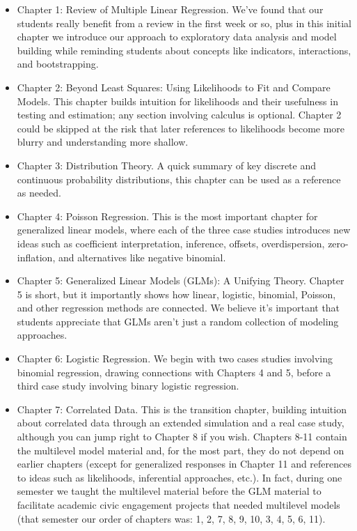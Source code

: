 \documentclass[
]{krantz}
\providecommand{\tightlist}{%
  \setlength{\itemsep}{0pt}\setlength{\parskip}{0pt}}
\begin{document}
\begin{itemize}
\tightlist
\item
  Chapter 1: Review of Multiple Linear Regression. We've found that our students really benefit from a review in the first week or so, plus in this initial chapter we introduce our approach to exploratory data analysis and model building while reminding students about concepts like indicators, interactions, and bootstrapping.
\item
  Chapter 2: Beyond Least Squares: Using Likelihoods to Fit and Compare Models. This chapter builds intuition for likelihoods and their usefulness in testing and estimation; any section involving calculus is optional. Chapter 2 could be skipped at the risk that later references to likelihoods become more blurry and understanding more shallow.
\item
  Chapter 3: Distribution Theory. A quick summary of key discrete and continuous probability distributions, this chapter can be used as a reference as needed.
\item
  Chapter 4: Poisson Regression. This is the most important chapter for generalized linear models, where each of the three case studies introduces new ideas such as coefficient interpretation, inference, offsets, overdispersion, zero-inflation, and alternatives like negative binomial.
\item
  Chapter 5: Generalized Linear Models (GLMs): A Unifying Theory. Chapter 5 is short, but it importantly shows how linear, logistic, binomial, Poisson, and other regression methods are connected. We believe it's important that students appreciate that GLMs aren't just a random collection of modeling approaches.
\item
  Chapter 6: Logistic Regression. We begin with two cases studies involving binomial regression, drawing connections with Chapters 4 and 5, before a third case study involving binary logistic regression.
\item
  Chapter 7: Correlated Data. This is the transition chapter, building intuition about correlated data through an extended simulation and a real case study, although you can jump right to Chapter 8 if you wish. Chapters 8-11 contain the multilevel model material and, for the most part, they do not depend on earlier chapters (except for generalized responses in Chapter 11 and references to ideas such as likelihoods, inferential approaches, etc.). In fact, during one semester we taught the multilevel material before the GLM material to facilitate academic civic engagement projects that needed multilevel models (that semester our order of chapters was: 1, 2, 7, 8, 9, 10, 3, 4, 5, 6, 11).

\end{itemize}
\end{document}
